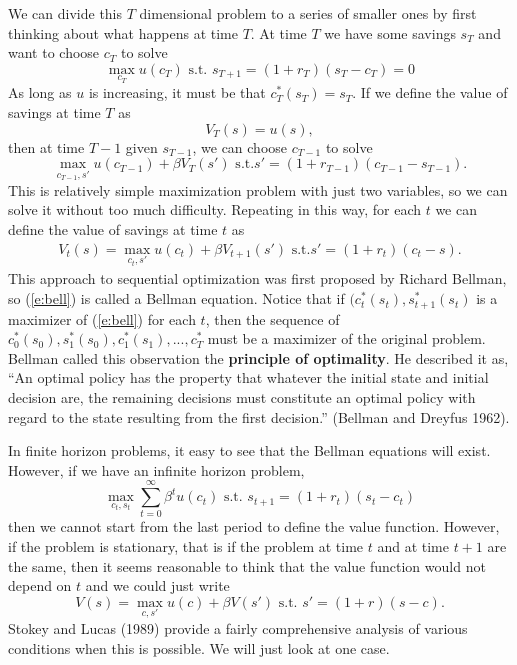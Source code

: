 \documentclass[12pt,reqno]{amsart}
\theoremstyle{definition}
\begin{document}
We can divide this $T$ dimensional problem to a
series of smaller ones by first thinking about what happens at time
$T$. At time $T$ we have some savings $s_T$ and want to choose $c_T$
to solve
\[ \max_{c_T} u(c_T) \text{ s.t. } s_{T+1} = (1+r_T)(s_T -c_T) = 0 \]
As long as $u$ is increasing, it must be that $c_T^*(s_T) = s_T$. If
we define the value of savings at time $T$ as
\[ V_T(s) = u(s), \]
then at time $T-1$ given $s_{T-1}$, we can choose $c_{T-1}$ to solve
\[ \max_{c_{T-1},s'} u(c_{T-1}) + \beta V_T(s') \text{ s.t.} s' =
  (1+r_{T-1})(c_{T-1}-s_{T-1}). \]
This is relatively simple maximization problem with just two
variables, so we can solve it without too much difficulty. Repeating
in this way, for each $t$ we can define the value of savings at time
$t$ as
\begin{align} 
  V_t(s) = \max_{c_t,s'} u(c_{t}) + \beta V_{t+1}(s') \text{ s.t.} s' =
  (1+r_{t})(c_{t}-s). \label{e:bell}
\end{align}
This approach to sequential optimization was first proposed by Richard
Bellman, so (\ref{e:bell}) is called a Bellman equation. Notice that
if $(c_t^*(s_t),s_{t+1}^*(s_t)$ is a maximizer of (\ref{e:bell}) for
each $t$, then 
the sequence of $c_0^*(s_0),s_1^*(s_0), c_1^*(s_1), ..., c_T^*$ must
be a maximizer of the original problem. Bellman called this
observation the \textbf{principle of optimality}. He described it as,
``An optimal policy has the property that whatever the initial state
and initial decision are, the remaining decisions must constitute an
optimal policy with regard to the state resulting from the first
decision.'' (Bellman and Dreyfus 1962). 

In finite horizon problems, it easy to see that the
Bellman equations will exist. However, if we have an infinite horizon
problem, 
\[ \max_{c_t,s_t} \sum_{t=0}^\infty \beta^t u(c_t) \text{ s.t. } s_{t+1} =
(1+r_t) (s_t - c_t) \]
then we cannot start from the last period to define the value
function. However, if the problem is stationary, that is if the
problem at time $t$ and at time $t+1$ are the same, then it seems
reasonable to think that the value function would not depend on $t$
and we could just write 
\[ V(s) = \max_{c,s'} u(c) + \beta V(s') \text{ s.t. } s' =
(1+r)(s-c). \]
Stokey and Lucas (1989) provide a fairly comprehensive analysis of
various conditions when this is possible. We will just look at one
case. 
\end{document}

